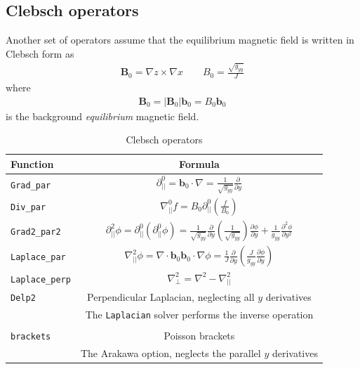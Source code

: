 \documentclass[12pt]{article}
\newcommand{\code}[1]{\texttt{#1}}
\def\L{\left}
\def\R{\right}
\newcommand{\deriv}[2]{\ensuremath{\frac{\partial #1}{\partial #2}}}
\begin{document}
\subsection{Clebsch operators}
Another set of operators assume that the equilibrium magnetic field is written
in Clebsch form as
%
%
\begin{align}
\mathbf{B}_0 = \nabla z\times\nabla x \qquad B_0 = \frac{\sqrt{g_{yy}}}{J}
\end{align}
%
where
%
\begin{align}
\mathbf{B}_0 = \L|\mathbf{B}_0\R|\mathbf{b}_0 = B_0 \mathbf{b}_0
\end{align}
%
is the background \emph{equilibrium} magnetic field.
%
\begin{table}[h!]
\centering
\caption{Clebsch operators}
%
\label{tab:clebsch_operators}
%
\begin{tabular}{l c}
\hline
Function & Formula \\
\hline
\code{Grad\_par} & $\displaystyle\partial^0_{||} = \mathbf{b}_0\cdot\nabla =
\frac{1}{\sqrt{g_{yy}}}\deriv{}{y}$ \\
\code{Div\_par} & $\displaystyle \nabla^0_{||}f =
B_0\partial^0_{||}\L(\frac{f}{B_0}\R)$ \\
\code{Grad2\_par2} & $\displaystyle \partial^2_{||}\phi =
\partial^0_{||}\L(\partial^0_{||}\phi\R) =
\frac{1}{\sqrt{g_{yy}}}\deriv{}{y}\L(\frac{1}{\sqrt{g_{yy}}}\R)\deriv{
\phi}{y} + \frac{1}{g_{yy}}\frac{\partial^2\phi}{\partial y^2}$ \\
\code{Laplace\_par} & $\displaystyle \nabla_{||}^2\phi =
\nabla\cdot\mathbf{b}_0\mathbf{b}_0\cdot\nabla\phi =
\frac{1}{J}\deriv{}{y}\L(\frac{J}{g_{yy}}\deriv{\phi}{y}\R)$ \\
\code{Laplace\_perp} & $\displaystyle \nabla_\perp^2 = \nabla^2 - \nabla_{||}^2$
\\
\code{Delp2} & Perpendicular Laplacian, neglecting all $y$ derivatives \\
             & The \code{Laplacian} solver performs the inverse operation \\
\\
\code{brackets} & Poisson brackets \\
                & The Arakawa option, neglects the parallel $y$ derivatives\\
\hline
\end{tabular}
%
\end{table}
%
\newpage
\end{document}
